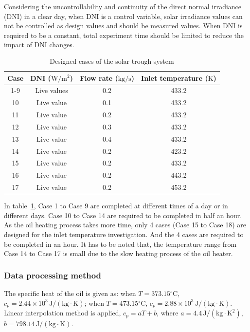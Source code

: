 
Considering the uncontrollability and continuity of the direct normal irradiance (DNI) in a clear day, when DNI is a control variable, solar irradiance values can not be controlled as design values and should be measured values. When DNI is required to be a constant, total experiment time should be limited to reduce the impact of DNI changes.

\begin{table}[htbp]\footnotesize
	\caption{Designed cases of the solar trough system}
	\begin{center}
	\begin{tabular}{cccc}
		\toprule
		Case	& DNI ($\mathrm{W/m^2}$)	&	Flow rate ($\mathrm{kg/s}$)			&	Inlet temperature ($\mathrm{K}$)\\
		\midrule
		1-9	&	Live values	&	0.2	&	433.2\\
		10	&	Live value	&	0.1	&	433.2\\
		11	&	Live value	&	0.2	&	433.2\\
		12	&	Live value	&	0.3	&	433.2\\
		13	&	Live value	&	0.4	&	433.2\\
		14	&	Live value	&	0.2	&	423.2\\
		15	&	Live value	&	0.2	&	433.2\\
		16	&	Live value	&	0.2	&	443.2\\
		17	&	Live value	&	0.2	&	453.2\\
		\bottomrule
	\end{tabular}
	\end{center}
	\label{tab:DesignedCasesForTrough}
\end{table}

In table~\ref{tab:DesignedCasesForTrough}, Case 1 to Case 9 are completed at different times of a day or in different days. Case 10 to Case 14 are required to be completed in half an hour. As the oil heating process takes more time, only 4 cases (Case 15 to Case 18) are designed for the inlet temperature investigation. And the 4 cases are required to be completed in an hour. It has to be noted that, the temperature range from Case 14 to Case 17 is small due to the slow heating process of the oil heater.

\subsubsection{Data processing method}
The specific heat of the oil is given as: when $T = 373.15\mathrm{^\circ C}$, $c_p = 2.44\times10^3\,\mathrm{J/(kg\cdot K)}$; when $T = 473.15\mathrm{^\circ C}$, $c_p = 2.88\times10^3\,\mathrm{J/(kg\cdot K)}$. Linear interpolation method is applied, $c_p = aT + b$, where $a = 4.4\,\mathrm{J/(kg \cdot K^2)}$, $b = 798.14\,\mathrm{J/(kg\cdot K)}$.

